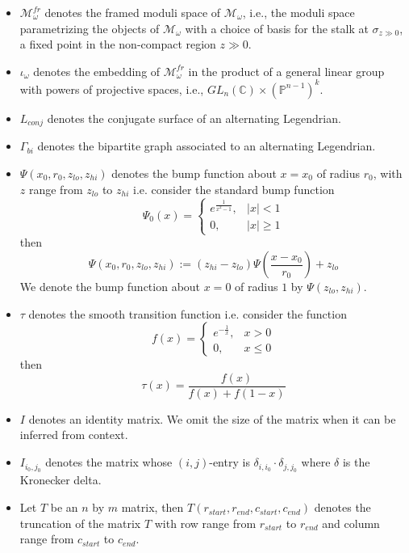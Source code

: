 \begin{itemize}[label={--}]
\item $\mathcal{M}_\omega^{fr}$ denotes the framed moduli space of $\mathcal{M}_\omega$, i.e., the moduli space parametrizing the objects of $\mathcal{M}_\omega$ with a choice of basis for the stalk at $\sigma_{z\gg 0}$, a fixed point in the non-compact region $z\gg 0$.

\item $\iota_\omega$ denotes the embedding of $\mathcal{M}_\omega^{fr}$ in the product of a general linear group with powers of projective spaces, i.e., $GL_n(\mathbb{C}) \times (\mathbb{P}^{n-1})^k$.

\item $L_{conj}$ denotes the conjugate surface of an alternating Legendrian.

\item $\Gamma_{bi}$ denotes the bipartite graph associated to an alternating Legendrian.

\item $\Psi(x_0,r_0,z_{lo},z_{hi})$ denotes the bump function about $x=x_0$ of radius $r_0$, with $z$ range from $z_{lo}$ to $z_{hi}$ i.e. consider the standard bump function 
$$\Psi_0(x) = \begin{cases}
  e^{\frac{1}{x^2 -1}}, & |x| < 1 \\
  0, & |x| \geq 1
  \end{cases}$$
then
\[
\Psi(x_0,r_0,z_{lo},z_{hi}) := (z_{hi} - z_{lo})\Psi(\frac{x-x_0}{r_0}) + z_{lo}
\]
We denote the bump function about $x=0$ of radius $1$ by $\Psi(z_{lo},z_{hi})$.

\item $\tau$ denotes the smooth transition function i.e. consider the function
  $$f(x) = \begin{cases}
  e^{-\frac{1}{x}}, & x > 0 \\
  0, & x \leq 0
  \end{cases}$$
then
  $$\tau(x) = \frac{f(x)}{f(x)+f(1-x)}$$

\item $I$ denotes an identity matrix. We omit the size of the matrix when it can be inferred from context.

\item $I_{i_0,j_0}$ denotes the matrix whose $(i,j)$-entry is $\delta_{i,i_0}\cdot \delta_{j,j_0}$ where $\delta$ is the Kronecker delta.

\item Let $T$ be an $n$ by $m$ matrix, then $T(r_{start},r_{end},c_{start},c_{end})$ denotes the truncation of the matrix $T$ with row range from $r_{start}$ to $r_{end}$ and column range from $c_{start}$ to $c_{end}$.


\end{itemize}
